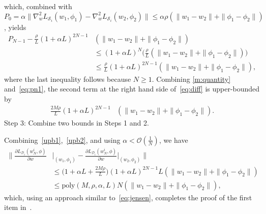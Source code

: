 \documentclass{osudissert96}
\begin{document}
which, combined  with $P_{0}=\alpha\|\nabla_w^2L_{\mathcal{S}_i}(w_1,\phi_1)-\nabla_w^2L_{\mathcal{S}_i}(w_2,\phi_2)\|\leq \alpha\rho(\|w_1-w_2\|+\|\phi_1-\phi_2\|)$, yields
\begin{align}\label{eq:pn1}
P_{N-1} - \frac{\rho}{L}(1+\alpha L)^{2N-1}  &(\|w_1-w_2\|+\|\phi_1-\phi_2\|)   \nonumber
\\&\leq (1+\alpha L)^{N}\Big(\frac{\rho}{L}(\|w_1-w_2\|+\|\phi_1-\phi_2\|) \Big)\nonumber
\\&\leq \frac{\rho}{L}(1+\alpha L)^{2N-1}  (\|w_1-w_2\|+\|\phi_1-\phi_2\|), 
 \end{align}
 where the last inequality follows because $N\geq 1$. 
 Combining \cref{m:quantity} and~\cref{eq:pn1}, the second term at the right hand side of~\cref{eq:diff} is upper-bounded by 
 \begin{align}\label{upb2}
\frac{ 2M\rho}{L}(1+\alpha L)^{2N-1}  &(\|w_1-w_2\|+\|\phi_1-\phi_2\|).
 \end{align}
 {Step 3: Combine two bounds in Steps 1 and 2.}
 
 Combining~\cref{upb1},~\cref{upb2}, and using $\alpha <\mathcal{O}(\frac{1}{N})$, we have 
 \begin{align}\label{eq:j1}
 \Big\| \frac{\partial L_{\mathcal{D}_i}( w^i_N,\phi)}{\partial w} &\Big |_{(w_1,\phi_1)} -  \frac{\partial L_{\mathcal{D}_i}( w^i_N,\phi)}{\partial w} \Big |_{(w_2,\phi_2)} \Big\| \nonumber
\\ &\leq \Big(1+\alpha L+\frac{2M\rho}{L}\Big) (1+\alpha L)^{2N-1} L(\|w_1-w_2\|+\|\phi_1-\phi_2\|) \nonumber
\\&\leq \text{poly}(M,\rho,\alpha,L) N(\|w_1-w_2\|+\|\phi_1-\phi_2\|),
\end{align}
which, using an approach similar to~\cref{eq:jensen}, completes the proof of the first item in~.
\end{document}
